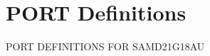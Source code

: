 \hypertarget{group___s_a_m_d21_g18_a_u__port}{}\section{P\+O\+RT Definitions}
\label{group___s_a_m_d21_g18_a_u__port}
P\+O\+RT D\+E\+F\+I\+N\+I\+T\+I\+O\+NS F\+OR S\+A\+M\+D21\+G18\+AU 